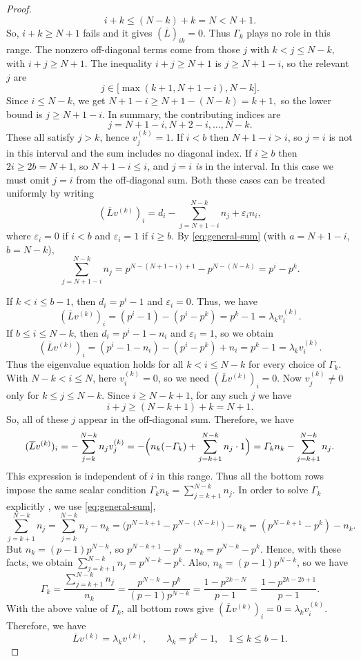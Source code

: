 \documentclass[10pt,a4paper]{amsart}
\begin{document}
\begin{proof}
	\[
	i+k \le (N-k)+k = N < N+1.
	\]
	So, $i+k\ge N+1$ fails and it gives $(\overline{L})_{ik}=0$. Thus $ \varGamma_k$ plays
	no role in this range. The nonzero off-diagonal terms come from those
	$j$ with $k<j\le N-k, $ with $ i+j\ge N+1.$
	The inequality $i+j\ge N+1$ is $j\ge N+1-i$, so the relevant $j$ are
	\[
	j\in\bigl[\max(k+1,N+1-i), N-k\bigr].
	\]
	Since $i\le N-k$, we get $N+1-i \ge N+1-(N-k)=k+1,$ 	so the lower bound is $j\ge N+1-i$. In summary, the contributing
	indices are
	\[
	j = N+1-i,N+2-i,\dots,N-k.
	\]
	These all satisfy $j>k$, hence $v^{(k)}_j=1$. 	If $i<b$ then $N+1-i > i$, so $j=i$ is not in this interval and the
	sum includes no diagonal index. If $i\ge b$ then $2i\ge 2b=N+1$, so
	$N+1-i \le i$, and $j=i$ \emph{is} in the interval. In this case we
	must omit $j=i$ from the off-diagonal sum. Both these cases can be treated
	uniformly by writing
	\[
	(\overline{L}v^{(k)})_i
	= d_i - \sum_{j=N+1-i}^{N-k} n_j + \varepsilon_i n_i,
	\]
	where $\varepsilon_i=0$ if $i<b$ and $\varepsilon_i=1$ if $i\ge b$. By \eqref{eq:general-sum} (with $a=N+1-i$, $b=N-k$),
	\[
	\sum_{j=N+1-i}^{N-k} n_j
	= p^{N-(N+1-i)+1}-p^{N-(N-k)}
	= p^i-p^k.
	\]
	
	If $k<i\le b-1$, then $d_i=p^i-1$ and $\varepsilon_i=0$.
	Thus, we have
	\[
	(\overline{L}v^{(k)})_i
	= (p^i-1) - (p^i-p^k)
	= p^k-1
	= \lambda_k v^{(k)}_i.
	\]
	If $b\le i\le N-k$, then $d_i=p^i-1-n_i$ and
	$\varepsilon_i=1$, so we obtain 
	\[
	(\overline{L}v^{(k)})_i
	= (p^i-1-n_i) - (p^i-p^k) + n_i
	= p^k-1
	= \lambda_k v^{(k)}_i.
	\]
	Thus the eigenvalue equation holds for all $k<i\le N-k$ for every
	choice of $ \varGamma_k$. With $N-k < i\le N$, here $v^{(k)}_i=0$, so we need $(\overline{L}v^{(k)})_i=0$.
	Now $v^{(k)}_j\ne 0$ only for $k\le j\le N-k$. Since
	$i\ge N-k+1$, for any such $j$ we have
	\[
	i+j \ge (N-k+1)+k = N+1.
	\]
	So, all of these $j$ appear in the off-diagonal sum. Therefore, we have
	\[
	(\overline{L}v^{(k)})_i
	= -\sum_{j=k}^{N-k} n_j v^{(k)}_j
	= -\Bigl(n_k(- \varGamma_k) + \sum_{j=k+1}^{N-k} n_j\cdot1\Bigr)
	=  \varGamma_k n_k - \sum_{j=k+1}^{N-k} n_j.
	\]
	This expression is independent of $i$ in this range. Thus all the
	bottom rows impose the same scalar condition $	 \varGamma_k n_k = \sum_{j=k+1}^{N-k} n_j.$
	In order to  solve  $ \varGamma_k$ explicitly , we use \eqref{eq:general-sum},
	\[
	\sum_{j=k+1}^{N-k} n_j
	= \sum_{j=k}^{N-k} n_j - n_k
	= \bigl(p^{N-k+1}-p^{N-(N-k)}\bigr) - n_k
	= (p^{N-k+1}-p^k) - n_k.
	\]
	But $n_k=(p-1)p^{N-k}$, so $	p^{N-k+1}-p^k-n_k = p^{N-k}-p^k.$
	Hence, with these facts, we obtain $	\sum_{j=k+1}^{N-k} n_j = p^{N-k}-p^k.$ Also, $n_k = (p-1)p^{N-k}$, so we have
	\[
	 \varGamma_k
	= \frac{\sum_{j=k+1}^{N-k} n_j}{n_k}
	= \frac{p^{N-k}-p^k}{(p-1)p^{N-k}}
	= \frac{1-p^{2k-N}}{p-1}
	= \frac{1-p^{ 2k-2b+1}}{p-1}.
	\]
	With the above value of $ \varGamma_k$, all bottom rows give $(\overline{L}v^{(k)})_i=0=\lambda_k v^{(k)}_i$. Therefore, we have 
	\[
	\overline{L}v^{(k)} = \lambda_k v^{(k)},\qquad
	\lambda_k=p^k-1,\quad 1\le k\le b-1.
	\]
	

\end{proof}
\end{document}
